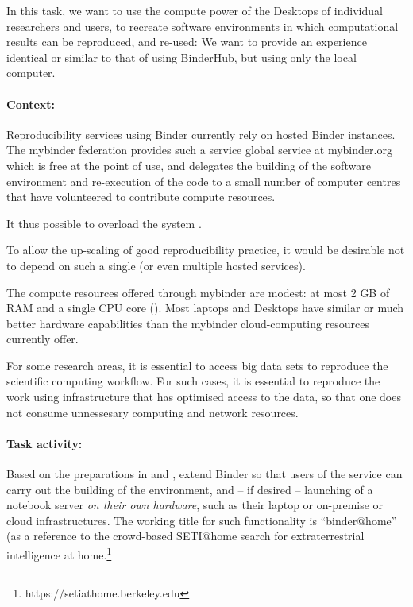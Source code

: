 \begin{task}[
  title=Binder@Home,
  id=binder-at-home,
  lead=SRL,
  PM=7,
  wphases={0-36},
  partners={MP,UIO}
]
In this task, we want to use the compute power of the Desktops of individual researchers and
users, to recreate software environments in which computational results can be
reproduced, and re-used: We want to provide an experience identical or similar
to that of using BinderHub, but using only the local computer.

\paragraph*{Context:} Reproducibility services using Binder currently rely on hosted Binder instances.
The mybinder federation provides such a service global service at mybinder.org
which is free at
the point of use, and delegates the building of the software environment and
re-execution of the code to a small number of computer centres that have
volunteered to contribute compute resources.

It thus possible to overload the system .

To allow the up-scaling of good reproducibility practice, it would be
desirable not to depend on such a single (or even multiple hosted services).

The compute resources offered through mybinder are modest: at most 2 GB of RAM
and a single CPU core ().
Most laptops and Desktops have similar or much better hardware capabilities than
the mybinder cloud-computing resources currently offer.

For some research areas, it is essential to access big data sets to reproduce the scientific computing workflow.  For such cases, it is essential to reproduce the work using infrastructure that has optimised access to the data, so that one does not consume unnessesary computing and network resources.  

\paragraph*{Task activity:} Based on the preparations in  and
, extend Binder so that users of the service can
carry out the building of the environment, and -- if desired -- launching of a
notebook server \emph{on their own hardware}, such as their laptop or on-premise or cloud infrastructures.   The working title for such
functionality is ``binder@home'' (as a reference to the crowd-based SETI@home search for
extraterrestrial intelligence at home.\footnote{https://setiathome.berkeley.edu}


\end{task}
